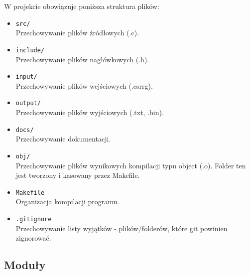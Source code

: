 \documentclass{article}
\begin{document}
    W projekcie obowiązuje poniższa struktura plików: \\


    \begin{itemize}
        \item \texttt{src/} \\
        Przechowywanie plików źródłowych (.c).
        \item \texttt{include/} \\
        Przechowywanie plików nagłówkowych (.h).
        \item \texttt{input/} \\
        Przechowywanie plików wejściowych (.csrrg).
        \item \texttt{output/} \\
        Przechowywanie plików wyjściowych (.txt, .bin).
        \item \texttt{docs/} \\
        Przechowywanie dokumentacji.
        \item \texttt{obj/} \\
        Przechowywanie plików wynikowych kompilacji typu object (.o). Folder ten jest tworzony i kasowany przez Makefile.
        \item \texttt{Makefile} \\
        Organizacja kompilacji programu.
        \item \texttt{.gitignore} \\
        Przechowywanie listy wyjątków - plików/folderów, które git powinien zignorować.
    \end{itemize}
    
    
    \subsection{Moduły}

    
    
\end{document}
